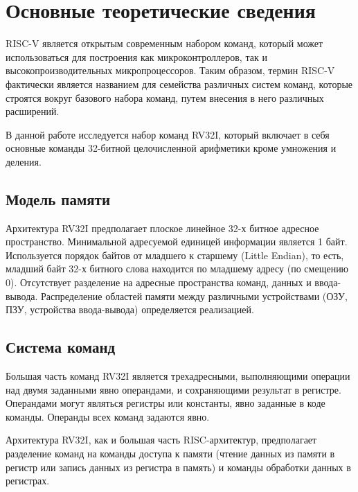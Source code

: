 \chapter{Основные теоретические сведения}

RISC-V является открытым современным набором команд, который может использоваться для построения как микроконтроллеров, так и высокопроизводительных микропроцессоров. Таким образом, термин RISC-V фактически является названием для семейства различных систем команд, которые строятся вокруг базового набора команд, путем внесения в него различных расширений.

В данной работе исследуется набор команд RV32I, который включает в себя основные команды 32-битной целочисленной арифметики кроме умножения и деления. 

\section{Модель памяти}

Архитектура RV32I предполагает плоское линейное 32-х битное адресное пространство. Минимальной адресуемой единицей информации является 1 байт. Используется порядок байтов от младшего к старшему (Little Endian), то есть, младший байт 32-х битного слова находится по младшему адресу (по смещению 0). Отсутствует разделение на адресные пространства команд, данных и ввода-вывода. Распределение областей памяти между различными устройствами (ОЗУ, ПЗУ, устройства ввода-вывода) определяется реализацией.

\section{Система команд}

Большая часть команд RV32I является трехадресными, выполняющими операции над двумя заданными явно операндами, и сохраняющими результат в регистре. Операндами могут являться регистры или константы, явно заданные в коде команды. Операнды всех команд задаются явно. 

Архитектура RV32I, как и большая часть RISC-архитектур, предполагает разделение команд на команды доступа к памяти (чтение данных из памяти в регистр или запись данных из регистра в память) и команды обработки данных в регистрах.

